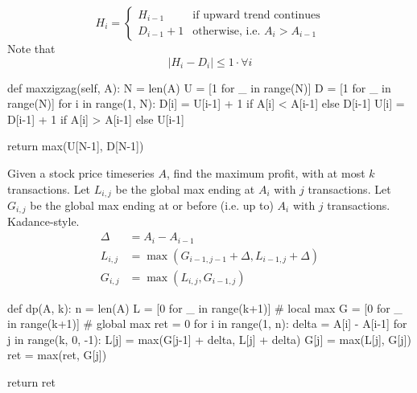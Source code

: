 \[
H_i =
  \begin{cases}
   H_{i-1} &\text{if upward trend continues}  \\
   D_{i-1} + 1 &\text{otherwise, i.e. } A_i > A_{i-1}
\end{cases}
\]
Note that 
$$
|H_i - D_i| \leq 1 \cdot \forall i
$$
\begin{center}

\end{center}

\begin{python}
def maxzigzag(self, A):
    N = len(A)
    U = [1 for _ in range(N)]
    D = [1 for _ in range(N)]
    for i in range(1, N):
        D[i] = U[i-1] + 1 if A[i] < A[i-1] else D[i-1]
        U[i] = D[i-1] + 1 if A[i] > A[i-1] else U[i-1]

    return max(U[N-1], D[N-1])
\end{python}
 Given a stock price timeseries $A$, find the maximum profit, with at most $k$ transactions.
Let $L_{i,j}$ be the global max ending at $A_i$ with $j$ transactions. Let $G_{i,j}$ be the global max ending at or before (i.e. up to) $A_i$ with $j$ transactions. Kadance-style.
\begin{align*}
\Delta &= A_i - A_{i-1} \\ 
L_{i,j} &= \max(G_{i-1,j-1}+\Delta, L_{i-1,j}+\Delta) \\
G_{i,j} &= \max(L_{i, j}, G_{i-1,j}) 
\end{align*}
\begin{python}
def dp(A, k):
    n = len(A)
    L = [0 for _ in range(k+1)]  # local max
    G = [0 for _ in range(k+1)]  # global max
    ret = 0
    for i in range(1, n):
        delta = A[i] - A[i-1]
        for j in range(k, 0, -1):
            L[j] = max(G[j-1] + delta, L[j] + delta)
            G[j] = max(L[j], G[j])
            ret = max(ret, G[j])

    return ret
\end{python}
